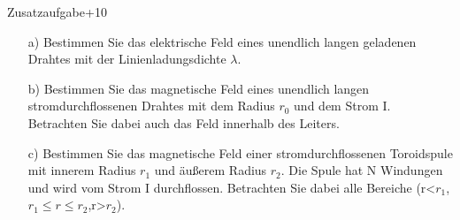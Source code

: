 \begin{exercise}{Zusatzaufgabe}{+10}
  \begin{enumerate}
    \item [a)] Bestimmen Sie das elektrische Feld eines unendlich langen geladenen Drahtes
               mit der Linienladungsdichte $\lambda$.
    \item [b)] Bestimmen Sie das magnetische Feld eines unendlich langen
               stromdurchflossenen Drahtes
               mit dem Radius $r_{0}$ und dem Strom I. Betrachten Sie dabei auch das Feld
               innerhalb des Leiters.
    \item [c)] Bestimmen Sie das magnetische Feld einer stromdurchflossenen
               Toroidspule mit innerem
               Radius $r_{1}$ und äu\ss erem Radius $r_{2}$. Die Spule hat N
               Windungen und wird vom Strom I durchflossen.
               Betrachten Sie dabei
               alle Bereiche (r<$r_{1}$,$r_{1}\leq r \leq r_{2}$,r>$r_{2}$).
  \end{enumerate}
\end{exercise}
